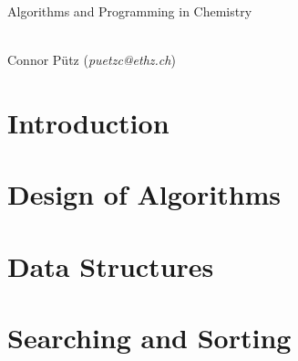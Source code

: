 \documentclass[a4paper,11pt]{scrartcl}
\begin{document}
\thispagestyle{empty}

\begin{center}
\begin{LARGE}\sectfont
Algorithms and Programming in Chemistry
\end{LARGE}\\\vspace{0.5cm}
Connor Pütz (\textit{puetzc@ethz.ch})
\\\vspace{1cm}
\end{center}

\tableofcontents

\newpage\section{Introduction}

\newpage\section{Design of Algorithms}

\newpage\section{Data Structures}

\newpage\section{Searching and Sorting}






\end{document}

